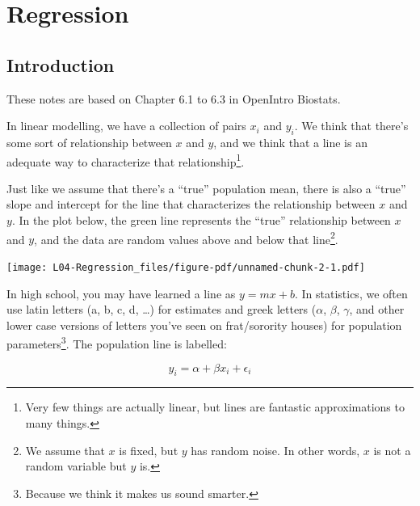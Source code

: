 \documentclass[
  letterpaper,
  DIV=11,
  numbers=noendperiod,
  oneside]{scrreprt}
\begin{document}
\hypertarget{regression}{%
\chapter{Regression}\label{regression}}

\hypertarget{introduction-2}{%
\section{Introduction}\label{introduction-2}}

These notes are based on Chapter 6.1 to 6.3 in OpenIntro Biostats.

In linear modelling, we have a collection of pairs \(x_i\) and \(y_i\).
We think that there's some sort of relationship between \(x\) and \(y\),
and we think that a line is an adequate way to characterize that
relationship\footnote{Very few things are actually linear, but lines are
  fantastic approximations to many things.}.

Just like we assume that there's a ``true'' population mean, there is
also a ``true'' slope and intercept for the line that characterizes the
relationship between \(x\) and \(y\). In the plot below, the green line
represents the ``true'' relationship between \(x\) and \(y\), and the
data are random values above and below that line\footnote{We assume that
  \(x\) is fixed, but \(y\) has random noise. In other words, \(x\) is
  not a random variable but \(y\) is.}.

\texttt{[image: L04-Regression\_files/figure-pdf/unnamed-chunk-2-1.pdf]}

In high school, you may have learned a line as \(y = mx + b\). In
statistics, we often use latin letters (a, b, c, d, \ldots) for
estimates and greek letters (\(\alpha\), \(\beta\), \(\gamma\), and
other lower case versions of letters you've seen on frat/sorority
houses) for population parameters\footnote{Because we think it makes us
  sound smarter.}. The population line is labelled:

\[
y_i = \alpha + \beta x_i + \epsilon_i
\]
\end{document}
